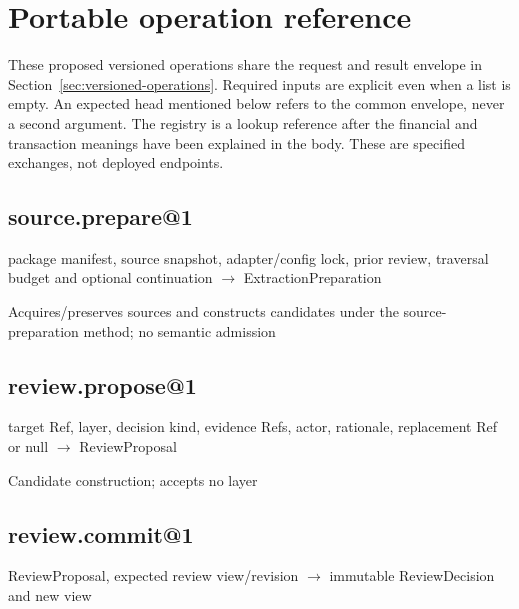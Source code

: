 \chapter{Portable operation reference}
\label{app:portable-interfaces}

These proposed versioned operations share the request and result envelope in
Section~\ref{sec:versioned-operations}. Required inputs are explicit even when
a list is empty. An expected head mentioned below refers to the common envelope,
never a second argument. The registry is a lookup reference after the financial
and transaction meanings have been explained in the body. These are specified
exchanges, not deployed endpoints.







\hypertarget{source.prepare1}{%
\section{source.prepare@1}\label{source.prepare1}}

package manifest, source snapshot, adapter/config lock, prior review, traversal budget and optional continuation \ensuremath{\rightarrow} ExtractionPreparation

Acquires/preserves sources and constructs candidates under the source-preparation method; no semantic admission

\hypertarget{review.propose1}{%
\section{review.propose@1}\label{review.propose1}}

target Ref, layer, decision kind, evidence Refs, actor, rationale, replacement Ref or null \ensuremath{\rightarrow} ReviewProposal

Candidate construction; accepts no layer

\hypertarget{review.commit1}{%
\section{review.commit@1}\label{review.commit1}}

ReviewProposal, expected review view/revision \ensuremath{\rightarrow} immutable ReviewDecision and new view

